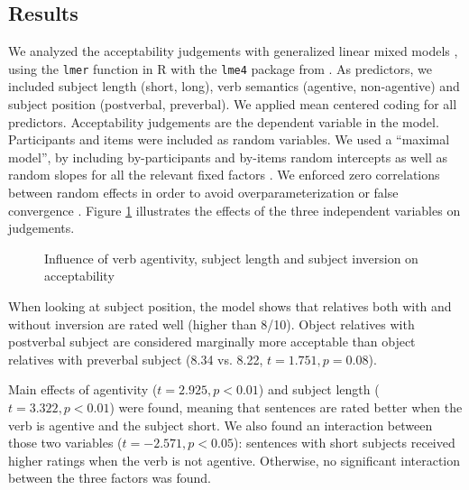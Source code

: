 \documentclass[output=paper]{langscibook}
\begin{document}
\subsection{Results}
We analyzed the acceptability judgements with generalized linear mixed models \citep{baayen2008mixed}, using the \texttt{lmer} function in R with the \texttt{lme4} package from \citet{Bates2015}. As predictors, we included subject length (short, long), verb semantics (agentive, non-agentive) and subject position (postverbal, preverbal). We applied mean centered coding for all predictors. Acceptability judgements are the dependent variable in the model. Participants and items were included as random variables. We used a ``maximal model'', by including by-participants and by-items random intercepts as well as random slopes for all the relevant fixed factors \citep{barr2013}. We enforced zero correlations between random effects in order to avoid overparameterization or false convergence \citep{Bates2015}.  Figure \ref{figure3judgementresults} illustrates the effects of the three independent variables on judgements. 

\begin{figure}
\caption{Influence of verb agentivity, subject length and subject
  inversion on acceptability\label{figure3judgementresults}}
\end{figure}


When looking at subject position, the model shows that relatives both with and without inversion are rated well (higher than 8/10). Object relatives with postverbal subject are considered marginally more acceptable than object relatives with preverbal subject (8.34 vs. 8.22, $t=1.751, p=0.08$).

Main effects of agentivity ($t=2.925, p<0.01$) and subject length ($t=3.322,\allowbreak p<0.01$) were found, meaning that sentences are rated better when the verb is agentive and the subject short. We also found an interaction between those two variables ($t=-2.571, p<0.05$): sentences with short subjects received higher ratings when the verb is not agentive. Otherwise, no significant interaction between the three factors was found. 
\end{document}

